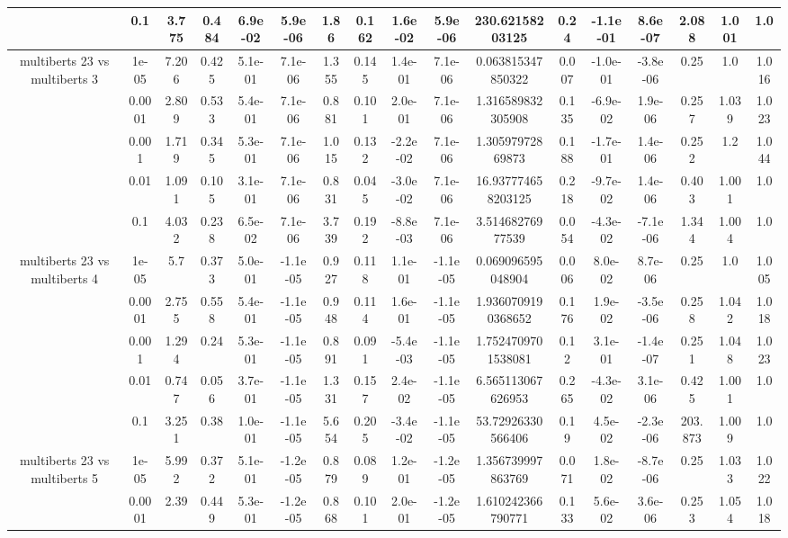 \begin{tabular}{|c|c|c|c|c|c|c|c|c|c|c|c|c|c|c|c|c|}
 & 0.1 & 3.775 & 0.484 & 6.9e-02 & 5.9e-06 & 1.86 & 0.162 & 1.6e-02 & 5.9e-06 & 230.62158203125 & 0.24 & -1.1e-01 & 8.6e-07 & 2.088 & 1.001 & 1.0 \\
\hline
\multirow{5}{*}{multiberts 23 vs multiberts 3} & 1e-05 & 7.206 & 0.425 & 5.1e-01 & 7.1e-06 & 1.355 & 0.145 & 1.4e-01 & 7.1e-06 & 0.063815347850322 & 0.007 & -1.0e-01 & -3.8e-06 & 0.25 & 1.0 & 1.016 \\
 & 0.0001 & 2.809 & 0.533 & 5.4e-01 & 7.1e-06 & 0.881 & 0.101 & 2.0e-01 & 7.1e-06 & 1.316589832305908 & 0.135 & -6.9e-02 & 1.9e-06 & 0.257 & 1.039 & 1.023 \\
 & 0.001 & 1.719 & 0.345 & 5.3e-01 & 7.1e-06 & 1.015 & 0.132 & -2.2e-02 & 7.1e-06 & 1.30597972869873 & 0.188 & -1.7e-01 & 1.4e-06 & 0.252 & 1.2 & 1.044 \\
 & 0.01 & 1.091 & 0.105 & 3.1e-01 & 7.1e-06 & 0.831 & 0.045 & -3.0e-02 & 7.1e-06 & 16.937774658203125 & 0.218 & -9.7e-02 & 1.4e-06 & 0.403 & 1.001 & 1.0 \\
 & 0.1 & 4.032 & 0.238 & 6.5e-02 & 7.1e-06 & 3.739 & 0.192 & -8.8e-03 & 7.1e-06 & 3.51468276977539 & 0.054 & -4.3e-02 & -7.1e-06 & 1.344 & 1.004 & 1.0 \\
\hline
\multirow{5}{*}{multiberts 23 vs multiberts 4} & 1e-05 & 5.7 & 0.373 & 5.0e-01 & -1.1e-05 & 0.927 & 0.118 & 1.1e-01 & -1.1e-05 & 0.069096595048904 & 0.006 & 8.0e-02 & 8.7e-06 & 0.25 & 1.0 & 1.005 \\
 & 0.0001 & 2.755 & 0.558 & 5.4e-01 & -1.1e-05 & 0.948 & 0.114 & 1.6e-01 & -1.1e-05 & 1.9360709190368652 & 0.176 & 1.9e-02 & -3.5e-06 & 0.258 & 1.042 & 1.018 \\
 & 0.001 & 1.294 & 0.24 & 5.3e-01 & -1.1e-05 & 0.891 & 0.091 & -5.4e-03 & -1.1e-05 & 1.7524709701538081 & 0.12 & 3.1e-01 & -1.4e-07 & 0.251 & 1.048 & 1.023 \\
 & 0.01 & 0.747 & 0.056 & 3.7e-01 & -1.1e-05 & 1.331 & 0.157 & 2.4e-02 & -1.1e-05 & 6.565113067626953 & 0.265 & -4.3e-02 & 3.1e-06 & 0.425 & 1.001 & 1.0 \\
 & 0.1 & 3.251 & 0.38 & 1.0e-01 & -1.1e-05 & 5.654 & 0.205 & -3.4e-02 & -1.1e-05 & 53.72926330566406 & 0.19 & 4.5e-02 & -2.3e-06 & 203.873 & 1.009 & 1.0 \\
\hline
\multirow{5}{*}{multiberts 23 vs multiberts 5} & 1e-05 & 5.992 & 0.372 & 5.1e-01 & -1.2e-05 & 0.879 & 0.089 & 1.2e-01 & -1.2e-05 & 1.356739997863769 & 0.071 & 1.8e-02 & -8.7e-06 & 0.25 & 1.033 & 1.022 \\
 & 0.0001 & 2.39 & 0.449 & 5.3e-01 & -1.2e-05 & 0.868 & 0.101 & 2.0e-01 & -1.2e-05 & 1.610242366790771 & 0.133 & 5.6e-02 & 3.6e-06 & 0.253 & 1.054 & 1.018 \\

\end{tabular}
